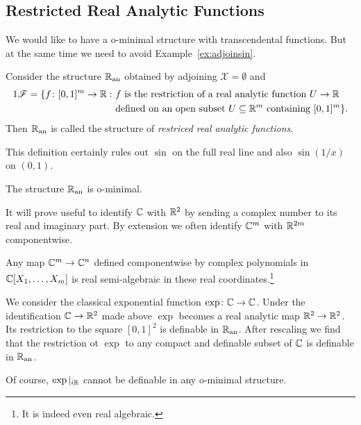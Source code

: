 \subsection{Restricted Real Analytic Functions}

We would like  to have a o-minimal structure with transcendental functions.
But at the same time we need to avoid  Example~\ref{ex:adjoinsin}.

\begin{definition}
  Consider the structure ${{\mathbb{R}}_{\mathrm{an}}}$ obtained by adjoining
  $\mathscr{X} = \emptyset$ and
  \begin{alignat*}1
    \mathscr{F} = \{f \colon [0,1]^m\rightarrow\IR:  \,\,&\text{$f$ is the
      restriction of a real analytic function $U\rightarrow \IR$}\\
    &\text{defined on an open subset
      $U\subset\IR^m$ containing $[0,1]^m$}\}.  
  \end{alignat*}
  Then ${{\mathbb{R}}_{\mathrm{an}}}$ is called the structure of \emph{restriced real analytic functions}.
\end{definition}

This definition certainly rules out $\sin$ on the full real line and
also $\sin(1/x)$ on $(0,1)$. 

\begin{theorem}
  The structure ${{\mathbb{R}}_{\mathrm{an}}}$ is o-minimal. 
\end{theorem}

\begin{convention}
  \label{conv:identCCRR2}
  It will prove useful to identify ${\mathbb{C}}$ with ${\mathbb{R}}^2$ by sending a
  complex number to its real and imaginary part. By extension we often
  identify ${\mathbb{C}}^m$ with ${\mathbb{R}}^{2m}$ componentwise.

  Any  map ${\mathbb{C}}^m\rightarrow {\mathbb{C}}^n$ defined componentwise by complex polynomials in
  ${\mathbb{C}}[X_1,\ldots,X_m]$
  is real semi-algebraic in these real coordinates.\footnote{It is
    indeed even real algebraic.}
\end{convention}

\begin{example}
  We consider the classical exponential function
  $\exp\colon{\mathbb{C}}\rightarrow{\mathbb{C}}$.  Under the identification
  ${\mathbb{C}}\rightarrow{\mathbb{R}}^2$ made above
  $\exp$ becomes a real analytic map
  ${\mathbb{R}}^2\rightarrow{\mathbb{R}}^2$.
  Its restriction to the square $[0,1]^2$ is definable in ${{\mathbb{R}}_{\mathrm{an}}}$.
  After rescaling we find that the restriction ot $\exp$ to any
  compact and definable subset of ${\mathbb{C}}$ is definable in ${{\mathbb{R}}_{\mathrm{an}}}$.

  Of course, $\exp|_{i{\mathbb{R}}}$ cannot be definable in any o-minimal
  structure. 
\end{example}

